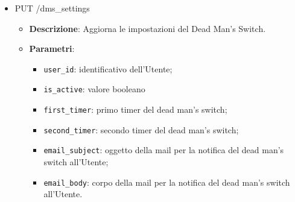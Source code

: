 \documentclass[a4paper,12pt]{article}
\newcommand{\code}[1]{{\ttfamily\textcolor{purple!85!black}{#1}}}
\begin{document}
\begin{itemize}
\begin{itemize}
            \item \textbf{Parametri}:
            \begin{itemize}
                \item \texttt{user\_id}: identificativo dell’Utente.
            \end{itemize}

            \item \textbf{Response}:
            \begin{itemize}
                \item \texttt{200 OK}: configurazione recuperata con successo.
                \item Corpo della risposta:
\begin{verbatim}
{
    "user_id": "user1",
    "is_active": true,
    "first_timer": 60,
    "second_timer": 120,
    "email_subject": "Messaggio di emergenza",
    "email_body": "Corpo del messaggio"
}
\end{verbatim}
            \end{itemize}

            \item \textbf{Errori}:
            \begin{itemize}
                \item \texttt{500 Internal Server Error}: errore interno del server.
            \end{itemize}
        \end{itemize}

    \item \code{PUT /dms\_settings}
        \begin{itemize}
            \item \textbf{Descrizione}: Aggiorna le impostazioni del Dead Man’s Switch.

            \item \textbf{Parametri}:
            \begin{itemize}
                \item \texttt{user\_id}: identificativo dell’Utente;
                \item \texttt{is\_active}: valore booleano 
                \item \texttt{first\_timer}: primo timer del dead man's switch;
                \item \texttt{second\_timer}: secondo timer del dead man's switch;
                \item \texttt{email\_subject}: oggetto della mail per la notifica del dead man's switch all'Utente;
                \item \texttt{email\_body}: corpo della mail per la notifica del dead man's switch all'Utente.
            \end{itemize}


\end{itemize}
\end{itemize}
\end{document}
